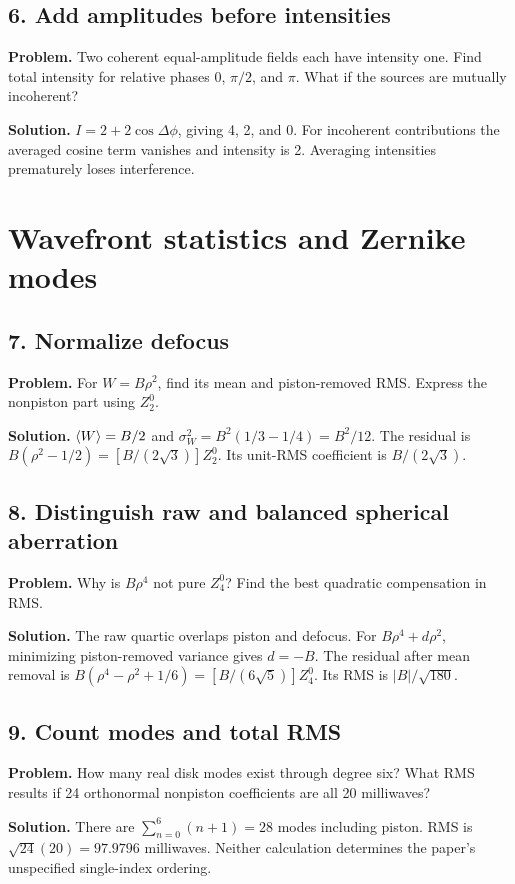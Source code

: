 \subsection*{6. Add amplitudes before intensities}
\textbf{Problem.} Two coherent equal-amplitude fields each have intensity
one. Find total intensity for relative phases 0, $\pi/2$, and $\pi$.
What if the sources are mutually incoherent?

\textbf{Solution.}
$I=2+2\cos\Delta\phi$, giving 4, 2, and 0.
For incoherent contributions the averaged cosine term vanishes and
intensity is 2. Averaging intensities prematurely loses interference.

\section{Wavefront statistics and Zernike modes}
\subsection*{7. Normalize defocus}
\textbf{Problem.} For $W=B\rho^2$, find its mean and piston-removed
RMS. Express the nonpiston part using $Z_2^0$.

\textbf{Solution.}
$\left\langle W\right\rangle=B/2$ and $\sigma_W^2=B^2(1/3-1/4)=B^2/12$.
The residual is
$B(\rho^2-1/2)=[B/(2\sqrt3)]Z_2^0$.
Its unit-RMS coefficient is $B/(2\sqrt3)$.

\subsection*{8. Distinguish raw and balanced spherical aberration}
\textbf{Problem.} Why is $B\rho^4$ not pure $Z_4^0$?
Find the best quadratic compensation in RMS.

\textbf{Solution.}
The raw quartic overlaps piston and defocus. For
$B\rho^4+d\rho^2$, minimizing piston-removed variance gives $d=-B$.
The residual after mean removal is
$B(\rho^4-\rho^2+1/6)=[B/(6\sqrt5)]Z_4^0$.
Its RMS is $|B|/\sqrt{180}$.

\subsection*{9. Count modes and total RMS}
\textbf{Problem.} How many real disk modes exist through degree six?
What RMS results if 24 orthonormal nonpiston coefficients are all
20 milliwaves?

\textbf{Solution.}
There are $\sum_{n=0}^6(n+1)=28$ modes including piston.
RMS is $\sqrt{24}(20)=97.9796$ milliwaves.
Neither calculation determines the paper's unspecified single-index ordering.

